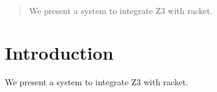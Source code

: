 \begin{abstract}
 We present a system to integrate Z3 with racket.
\end{abstract}
\section{Introduction}
 We present a system to integrate Z3 with racket.
